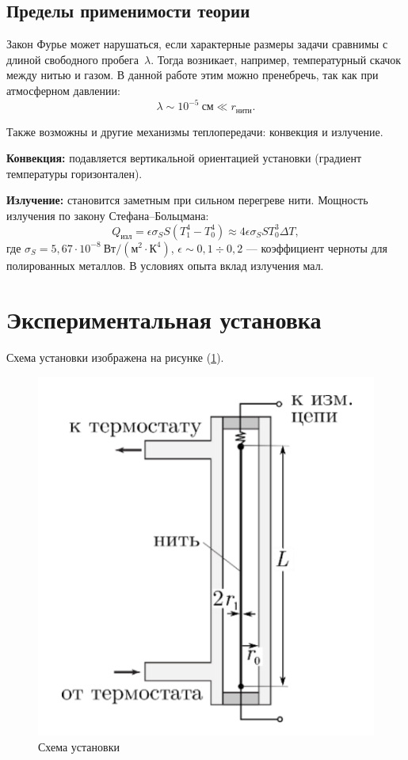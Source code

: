 \documentclass[a4paper,12pt]{article} %
\begin{document}
\subsection*{Пределы применимости теории}

Закон Фурье может нарушаться, если характерные размеры задачи сравнимы с длиной свободного пробега~$\lambda$. Тогда возникает, например, температурный скачок между нитью и газом. В данной работе этим можно пренебречь, так как при атмосферном давлении:
\[
\lambda \sim 10^{-5}~\text{см} \ll r_\text{нити}.
\]

Также возможны и другие механизмы теплопередачи: конвекция и излучение.

\textbf{Конвекция:} подавляется вертикальной ориентацией установки (градиент температуры горизонтален).

\textbf{Излучение:} становится заметным при сильном перегреве нити. Мощность излучения по закону Стефана–Больцмана:
\[
Q_{\text{изл}} = \epsilon \sigma_S S (T_1^4 - T_0^4) \approx 4 \epsilon \sigma_S S T_0^3 \Delta T,
\]
где $\sigma_S = 5{,}67 \cdot 10^{-8}~\text{Вт}/(\text{м}^2\cdot\text{К}^4)$, $\epsilon \sim 0{,}1 \div 0{,}2$ — коэффициент черноты для полированных металлов. В условиях опыта вклад излучения мал.



\section*{Экспериментальная установка}

Схема установки изображена на рисунке (\ref{fig:setup}). 

\begin{figure}[h!]
  \centering
  \includegraphics[scale = 0.5]{setup.png}
  \caption{Схема установки}
  \label{fig:setup}
\end{figure}
\end{document}
